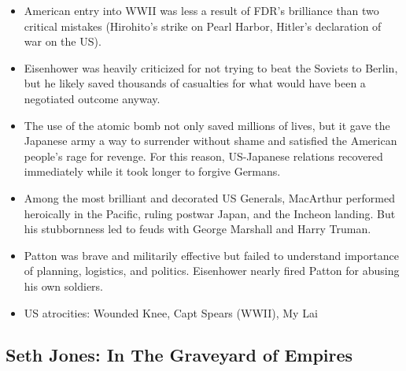 \documentclass[
]{article}
\begin{document}
\begin{itemize}
\item
  American entry into WWII was less a result of FDR's brilliance than
  two critical mistakes (Hirohito's strike on Pearl Harbor, Hitler's
  declaration of war on the US).
\item
  Eisenhower was heavily criticized for not trying to beat the Soviets
  to Berlin, but he likely saved thousands of casualties for what would
  have been a negotiated outcome anyway.
\item
  The use of the atomic bomb not only saved millions of lives, but it
  gave the Japanese army a way to surrender without shame and satisfied
  the American people's rage for revenge. For this reason, US-Japanese
  relations recovered immediately while it took longer to forgive
  Germans.
\item
  Among the most brilliant and decorated US Generals, MacArthur
  performed heroically in the Pacific, ruling postwar Japan, and the
  Incheon landing. But his stubbornness led to feuds with George
  Marshall and Harry Truman.
\item
  Patton was brave and militarily effective but failed to understand
  importance of planning, logistics, and politics. Eisenhower nearly
  fired Patton for abusing his own soldiers.
\item
  US atrocities: Wounded Knee, Capt Spears (WWII), My Lai
\end{itemize}

\hypertarget{seth-jones-in-the-graveyard-of-empires}{%
\subsection{Seth Jones: In The Graveyard of
Empires}\label{seth-jones-in-the-graveyard-of-empires}}
\end{document}
